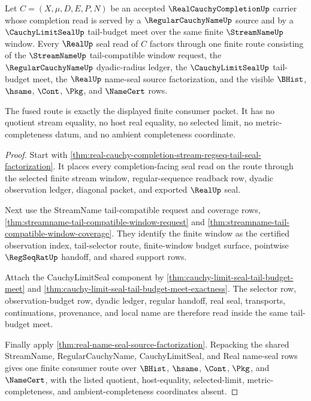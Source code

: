 \begin{theorem}
\label{thm:real-cauchy-completion-tail-selector-fusion}
Let $C=(X,\mu,D,E,P,N)$ be an accepted $\RealCauchyCompletionUp$ carrier whose completion read is served by a $\RegularCauchyNameUp$ source and by a $\CauchyLimitSealUp$ tail-budget meet over the same finite $\StreamNameUp$ window. Every $\RealUp$ seal read of $C$ factors through one finite route consisting of the $\StreamNameUp$ tail-compatible window request, the $\RegularCauchyNameUp$ dyadic-radius ledger, the $\CauchyLimitSealUp$ tail-budget meet, the $\RealUp$ name-seal source factorization, and the visible $\BHist$, $\hsame$, $\Cont$, $\Pkg$, and $\NameCert$ rows.

The fused route is exactly the displayed finite consumer packet. It has no quotient stream equality, no host real equality, no selected limit, no metric-completeness datum, and no ambient completeness coordinate.
\end{theorem}
\begin{proof}
Start with \autoref{thm:real-cauchy-completion-stream-regseq-tail-seal-factorization}. It places every completion-facing seal read on the route through the selected finite stream window, regular-sequence readback row, dyadic observation ledger, diagonal packet, and exported $\RealUp$ seal.

Next use the StreamName tail-compatible request and coverage rows, \autoref{thm:streamname-tail-compatible-window-request} and \autoref{thm:streamname-tail-compatible-window-coverage}. They identify the finite window as the certified observation index, tail-selector route, finite-window budget surface, pointwise $\RegSeqRatUp$ handoff, and shared support rows.

Attach the CauchyLimitSeal component by \autoref{thm:cauchy-limit-seal-tail-budget-meet} and \autoref{thm:cauchy-limit-seal-tail-budget-meet-exactness}. The selector row, observation-budget row, dyadic ledger, regular handoff, real seal, transports, continuations, provenance, and local name are therefore read inside the same tail-budget meet.

Finally apply \autoref{thm:real-name-seal-source-factorization}. Repacking the shared StreamName, RegularCauchyName, CauchyLimitSeal, and Real name-seal rows gives one finite consumer route over $\BHist$, $\hsame$, $\Cont$, $\Pkg$, and $\NameCert$, with the listed quotient, host-equality, selected-limit, metric-completeness, and ambient-completeness coordinates absent.
\end{proof}


